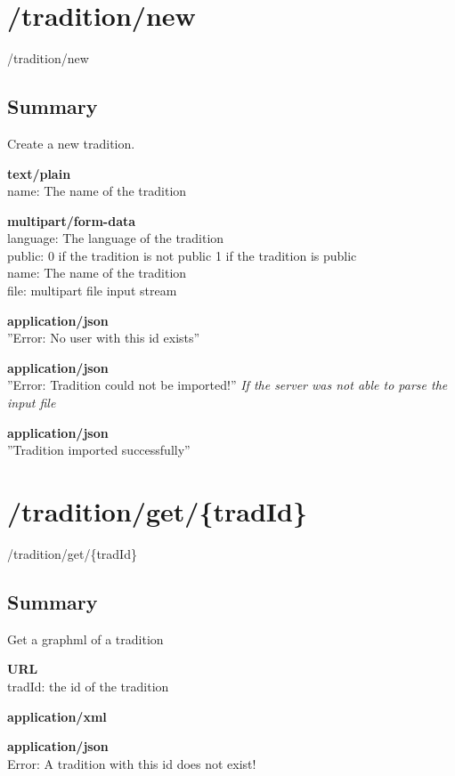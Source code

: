 \documentclass[11pt,fleqn,openany]{book} %
\begin{document}
\section{/tradition/new}
\begin{post}
/tradition/new
\end{post}

\subsection*{Summary}
Create a new tradition.
\begin{parameter}
\textbf{text/plain}\\
name: The name of the tradition
\end{parameter}
\begin{parameter}
\textbf{multipart/form-data}\\
language: The language of the tradition\\
public: 0 if the tradition is not public 1 if the tradition is public\\
name: The name of the tradition\\
file: multipart file input stream
\end{parameter}
\begin{return}[CONFLICT]
\textbf{application/json}\\
''Error: No user with this id exists''
\end{return}
\begin{return}
\textbf{application/json}\\
''Error: Tradition could not be imported!''
\textit{If the server was not able to parse the input file}
\end{return}
\begin{return}[OK]
\textbf{application/json}\\
''Tradition imported successfully''
\end{return}

\section{/tradition/get/\{tradId\}}
\begin{get}
/tradition/get/\{tradId\}
\end{get}

\subsection*{Summary}
Get a graphml of a tradition
\begin{parameter}\textbf{URL}\\
tradId: the id of the tradition \\
\end{parameter}
\begin{return}[OK]
\textbf{application/xml}\\

\end{return}
\begin{return}
\textbf{application/json}\\
Error: A tradition with this id does not exist!
\end{return}
\end{document}
